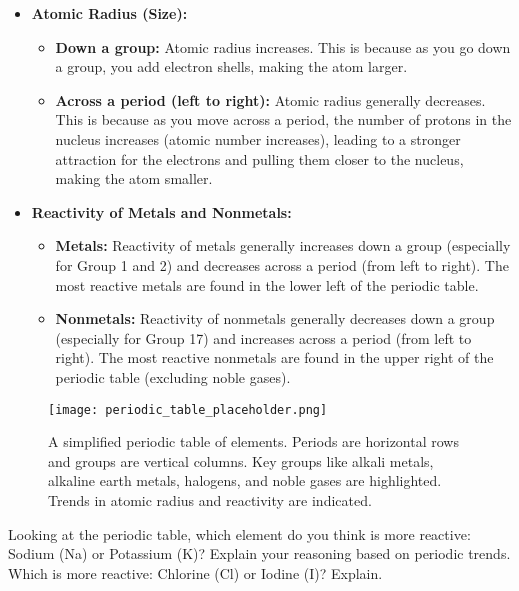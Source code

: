 \begin{itemize}
    \item \textbf{Atomic Radius (Size):}
    \begin{itemize}
        \item \textbf{Down a group:} Atomic radius increases. This is because as you go down a group, you add electron shells, making the atom larger.
        \item \textbf{Across a period (left to right):} Atomic radius generally decreases. This is because as you move across a period, the number of protons in the nucleus increases (atomic number increases), leading to a stronger attraction for the electrons and pulling them closer to the nucleus, making the atom smaller.
    \end{itemize}

    \item \textbf{Reactivity of Metals and Nonmetals:}
    \begin{itemize}
        \item \textbf{Metals:} Reactivity of metals generally increases down a group (especially for Group 1 and 2) and decreases across a period (from left to right). The most reactive metals are found in the lower left of the periodic table.
        \item \textbf{Nonmetals:} Reactivity of nonmetals generally decreases down a group (especially for Group 17) and increases across a period (from left to right). The most reactive nonmetals are found in the upper right of the periodic table (excluding noble gases).
    \end{itemize}
\end{itemize}

\begin{figure}
\centering
\texttt{[image: periodic\_table\_placeholder.png]}
\caption{A simplified periodic table of elements. Periods are horizontal rows and groups are vertical columns. Key groups like alkali metals, alkaline earth metals, halogens, and noble gases are highlighted. Trends in atomic radius and reactivity are indicated.}
\label{fig:periodic_table}
\end{figure}


\begin{stopandthink}
Looking at the periodic table, which element do you think is more reactive: Sodium (Na) or Potassium (K)?  Explain your reasoning based on periodic trends. Which is more reactive: Chlorine (Cl) or Iodine (I)? Explain.
\end{stopandthink}


